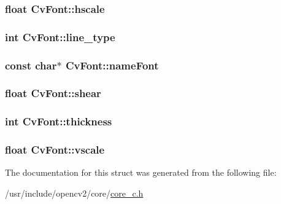 \hypertarget{structCvFont_a5c8d8de16accb4814af7467131cd8097}{
\subsubsection[{hscale}]{\setlength{\rightskip}{0pt plus 5cm}float Cv\-Font\-::hscale}}\label{structCvFont_a5c8d8de16accb4814af7467131cd8097}
\hypertarget{structCvFont_aad561dba61a70aea869ea429bf692299}{
\subsubsection[{line\-\_\-type}]{\setlength{\rightskip}{0pt plus 5cm}int Cv\-Font\-::line\-\_\-type}}\label{structCvFont_aad561dba61a70aea869ea429bf692299}
\hypertarget{structCvFont_afcf7e25a5fb94a5a35a75f073bd3a3d0}{
\subsubsection[{name\-Font}]{\setlength{\rightskip}{0pt plus 5cm}const char$\ast$ Cv\-Font\-::name\-Font}}\label{structCvFont_afcf7e25a5fb94a5a35a75f073bd3a3d0}
\hypertarget{structCvFont_a8c8c6ec0d06f325d1f6d460993ef9cd1}{
\subsubsection[{shear}]{\setlength{\rightskip}{0pt plus 5cm}float Cv\-Font\-::shear}}\label{structCvFont_a8c8c6ec0d06f325d1f6d460993ef9cd1}
\hypertarget{structCvFont_a9a7b17d7af1c32cc0955997ba87e0729}{
\subsubsection[{thickness}]{\setlength{\rightskip}{0pt plus 5cm}int Cv\-Font\-::thickness}}\label{structCvFont_a9a7b17d7af1c32cc0955997ba87e0729}
\hypertarget{structCvFont_ada5bc81a795b54864e5b4584223281e2}{
\subsubsection[{vscale}]{\setlength{\rightskip}{0pt plus 5cm}float Cv\-Font\-::vscale}}\label{structCvFont_ada5bc81a795b54864e5b4584223281e2}


The documentation for this struct was generated from the following file\-:\begin{DoxyCompactItemize}
\item 
/usr/include/opencv2/core/\hyperlink{core__c_8h}{core\-\_\-c.\-h}\end{DoxyCompactItemize}
